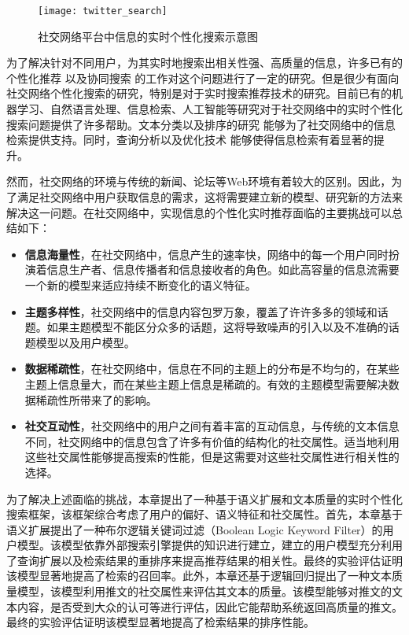 \begin{figure}[!htbp] %
  \centering
  \texttt{[image: twitter\_search]}
  \caption{社交网络平台中信息的实时个性化搜索示意图}
  \label{fig:twitter_search}
\end{figure}

为了解决针对不同用户，为其实时地搜索出相关性强、高质量的信息，许多已有的个性化推荐 以及协同搜索 的工作对这个问题进行了一定的研究。但是很少有面向社交网络个性化搜索的研究，特别是对于实时搜索推荐技术的研究。目前已有的机器学习、自然语言处理、信息检索、人工智能等研究对于社交网络中的实时个性化搜索问题提供了许多帮助。文本分类以及排序的研究 能够为了社交网络中的信息检索提供支持。同时，查询分析以及优化技术 能够使得信息检索有着显著的提升。

然而，社交网络的环境与传统的新闻、论坛等Web环境有着较大的区别。因此，为了满足社交网络中用户获取信息的需求，这将需要建立新的模型、研究新的方法来解决这一问题。在社交网络中，实现信息的个性化实时推荐面临的主要挑战可以总结如下：
\begin{itemize}
  \item \textbf{信息海量性}，在社交网络中，信息产生的速率快，网络中的每一个用户同时扮演着信息生产者、信息传播者和信息接收者的角色。如此高容量的信息流需要一个新的模型来适应持续不断变化的语义特征。
  \item \textbf{主题多样性}，社交网络中的信息内容包罗万象，覆盖了许许多多的领域和话题。如果主题模型不能区分众多的话题，这将导致噪声的引入以及不准确的话题模型以及用户模型。
  \item \textbf{数据稀疏性}，在社交网络中，信息在不同的主题上的分布是不均匀的，在某些主题上信息量大，而在某些主题上信息是稀疏的。有效的主题模型需要解决数据稀疏性所带来了的影响。
  \item \textbf{社交互动性}，社交网络中的用户之间有着丰富的互动信息，与传统的文本信息不同，社交网络中的信息包含了许多有价值的结构化的社交属性。适当地利用这些社交属性能够提高搜索的性能，但是这需要对这些社交属性进行相关性的选择。
\end{itemize}

为了解决上述面临的挑战，本章提出了一种基于语义扩展和文本质量的实时个性化搜索框架，该框架综合考虑了用户的偏好、语义特征和社交属性。首先，本章基于语义扩展提出了一种布尔逻辑关键词过滤（Boolean Logic Keyword Filter）的用户模型。该模型依靠外部搜索引擎提供的知识进行建立，建立的用户模型充分利用了查询扩展以及检索结果的重排序来提高推荐结果的相关性。最终的实验评估证明该模型显著地提高了检索的召回率。此外，本章还基于逻辑回归提出了一种文本质量模型，该模型利用推文的社交属性来评估其文本的质量。该模型能够对推文的文本内容，是否受到大众的认可等进行评估，因此它能帮助系统返回高质量的推文。最终的实验评估证明该模型显著地提高了检索结果的排序性能。

